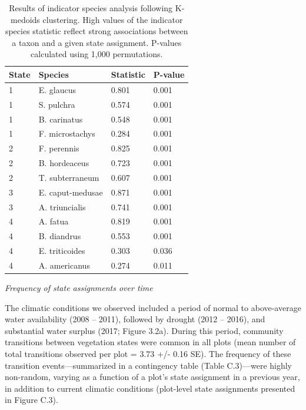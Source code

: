 \documentclass[twoside,12pt,final]{ucthesis-CA2012}
\begin{document}
\begin{ucmainmatter}
\begin{figure}
\end{figure}
\begin{table}[ht]
\centering
\begin{tabular}{llll}
  \hline
State & Species & Statistic & P-value \\ 
  \hline
1 & E. glaucus & 0.801 & 0.001 \\ 
  1 & S. pulchra & 0.574 & 0.001 \\ 
  1 & B. carinatus & 0.548 & 0.001 \\ 
  1 & F. microstachys & 0.284 & 0.001 \\ 
  2 & F. perennis & 0.825 & 0.001 \\ 
  2 & B. hordeaceus & 0.723 & 0.001 \\ 
  2 & T. subterraneum & 0.607 & 0.001 \\ 
  3 & E. caput-medusae & 0.871 & 0.001 \\ 
  3 & A. triuncialis & 0.741 & 0.001 \\ 
  4 & A. fatua & 0.819 & 0.001 \\ 
  4 & B. diandrus & 0.553 & 0.001 \\ 
  4 & E. triticoides & 0.303 & 0.036 \\ 
  4 & A. americanus & 0.274 & 0.011 \\ 
   \hline
\end{tabular}
\caption{Results of indicator species analysis following K-medoids clustering. High values of the indicator species statistic reflect strong associations between a taxon and a given state assignment. P-values calculated using 1,000 permutations.} 
\end{table}
\emph{Frequency of state assignments over time}

The climatic conditions we observed included a period of normal to above-average water availability (2008 -- 2011), followed by drought (2012 -- 2016), and substantial water surplus (2017; Figure 3.2a).
During this period, community transitions between vegetation states were common in all plots (mean number of total transitions observed per plot = 3.73 +/- 0.16 SE).
The frequency of these transition events---summarized in a contingency table (Table C.3)---were highly non-random, varying as a function of a plot's state assignment in a previous year, in addition to current climatic conditions (plot-level state assignments presented in Figure C.3).


\end{ucmainmatter}
\end{document}
